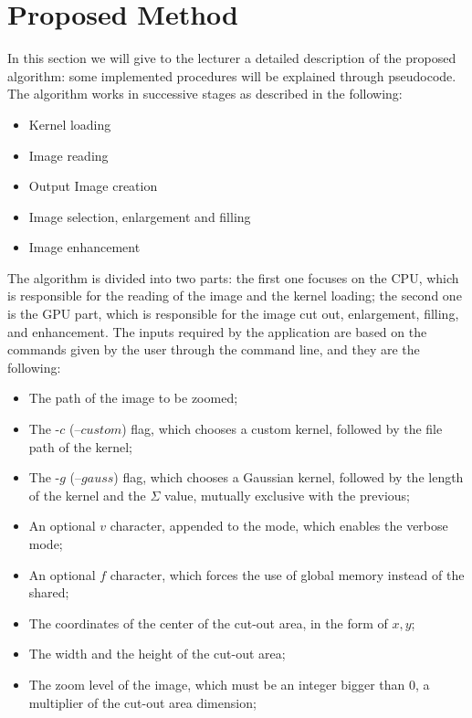 \section{Proposed Method}

In this section we will give to the lecturer a detailed description of the proposed algorithm: 
some implemented procedures will be explained through pseudocode. 
The algorithm works in successive stages as described in the following:

\begin{itemize}
    \item Kernel loading
    \item Image reading
    \item Output Image creation
    \item Image selection, enlargement and filling
    \item Image enhancement
\end{itemize}

The algorithm is divided into two parts: the first one focuses on the CPU, which is responsible for the reading of the image
and the kernel loading; the second one is the GPU part, which is responsible for the image cut out, enlargement, filling, and enhancement.
The inputs required by the application are based on the commands given by the user through the command line, and they are the following:
\begin{itemize}
    \item The path of the image to be zoomed;
    \item The -$c$ (--$custom$) flag, which chooses a custom kernel, followed by the file path of the kernel;
    \item The -$g$ (--$gauss$) flag, which chooses a Gaussian kernel, followed by the length of the kernel and the $\Sigma$ value, mutually exclusive with the previous;
    \item An optional $v$ character, appended to the mode, which enables the verbose mode;
    \item An optional $f$ character, which forces the use of global memory instead of the shared;
    \item The coordinates of the center of the cut-out area, in the form of $x,y$;
    \item The width and the height of the cut-out area;
    \item The zoom level of the image, which must be an integer bigger than 0, a multiplier of the cut-out area dimension;
\end{itemize}

